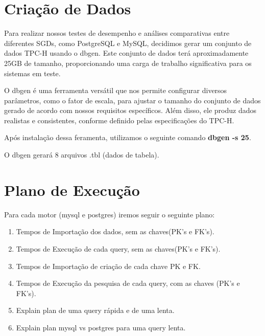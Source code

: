 \documentclass{article}
\begin{document}
\section{Criação de Dados}

\texttt{}\par Para realizar nossos testes de desempenho e análises comparativas entre diferentes SGDs, como PostgreSQL e MySQL, decidimos gerar um conjunto de dados TPC-H usando o dbgen. Este conjunto de dados terá aproximadamente 25GB de tamanho, proporcionando uma carga de trabalho significativa para os sistemas em teste.\\

\texttt{}\par O dbgen é uma ferramenta versátil que nos permite configurar diversos parâmetros, como o fator de escala, para ajustar o tamanho do conjunto de dados gerado de acordo com nossos requisitos específicos. Além disso, ele produz dados realistas e consistentes, conforme definido pelas especificações do TPC-H.


\texttt{}\par Após instalação dessa feramenta, utilizamos o seguinte comando \textbf{dbgen -s 25}.

\texttt{}\par O dbgen gerará 8 arquivos .tbl (dados de tabela).




\section{Plano de Execução}


\texttt{}\par Para cada motor (mysql e postgres) iremos seguir o seguinte plano:

\begin{enumerate}
    \item Tempos de Importação dos dados, sem as chaves(PK's e FK's).
    \item Tempos de Execução de cada query, sem as chaves(PK's e FK's).
    \item Tempos de Importação de criação de cada chave PK e FK.
    \item Tempos de Execução da pesquisa de cada query, com as chaves (PK's e FK's).
    \item Explain plan de uma query rápida e de uma lenta.
    \item Explain plan mysql vs postgres para uma query lenta.
\end{enumerate}
\end{document}
